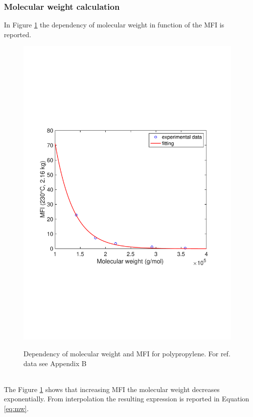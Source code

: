 \documentclass[a4paper, 11pt]{article}
\begin{document}
\newpage

\subsubsection{Molecular weight calculation}

In Figure \ref{fig:mw} the dependency of molecular weight in function of the MFI is reported.
\begin{figure}[h!]
	\centering
	{\includegraphics[scale=0.4]{mw}}
	\captionsetup{justification=centering}
	\caption{Dependency of molecular weight and MFI for polypropylene. For ref. data see Appendix B}
	\label{fig:mw}
\end{figure}\\
The Figure \ref{fig:mw} shows that increasing MFI the molecular weight decreases exponentially. From interpolation the resulting expression is reported in Equation \ref{eq:mw}. 
\end{document}
